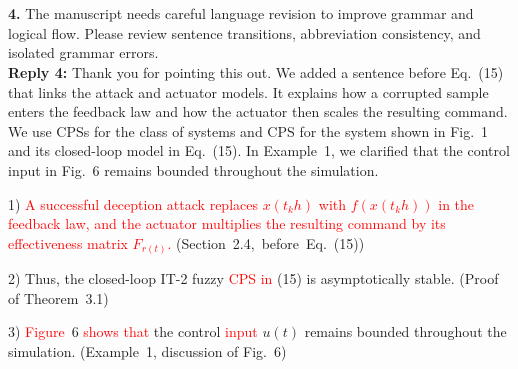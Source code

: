 \documentclass[10pt,fleqn]{article}
\begin{document}
~\\
\\
\textbf{4.} The manuscript needs careful language revision to improve grammar and logical flow. Please review sentence transitions, abbreviation consistency, and isolated grammar errors.
\\[10pt]
\begingroup
\setlength{\parskip}{6pt}
\indent \textbf{Reply 4:} Thank you for pointing this out. We added a sentence before Eq.~(15) that links the attack and actuator models. It explains how a corrupted sample enters the feedback law and how the actuator then scales the resulting command. We use CPSs for the class of systems and CPS for the system shown in Fig.~1 and its closed-loop model in Eq.~(15). In Example~1, we clarified that the control input in Fig.~6 remains bounded throughout the simulation.\par
1) \textcolor{red}{A successful deception attack replaces $x(t_kh)$ with $f(x(t_kh))$ in the feedback law, and the actuator multiplies the resulting command by its effectiveness matrix $F_{r(t)}$.} \mbox{(Section~2.4, before Eq.~(15))}\par
2) Thus, the closed-loop IT-2 fuzzy \textcolor{red}{CPS in} (15) is asymptotically stable. (Proof of Theorem~3.1)\par
3) \textcolor{red}{Figure}~6 \textcolor{red}{shows that} the control \textcolor{red}{input} $u(t)$ remains bounded throughout the simulation. (Example~1, discussion of Fig.~6)\par
\endgroup
\end{document}
